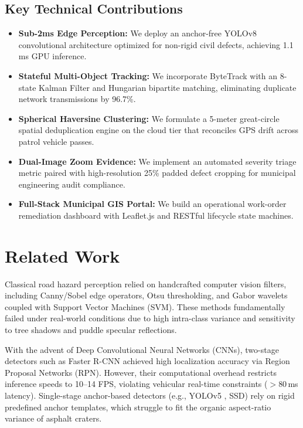 \documentclass[conference]{IEEEtran}
\begin{document}
\subsection{Key Technical Contributions}
\begin{itemize}
    \item \textbf{Sub-2ms Edge Perception:} We deploy an anchor-free YOLOv8 convolutional architecture optimized for non-rigid civil defects, achieving 1.1\,ms GPU inference.
    \item \textbf{Stateful Multi-Object Tracking:} We incorporate ByteTrack with an 8-state Kalman Filter and Hungarian bipartite matching, eliminating duplicate network transmissions by 96.7\%.
    \item \textbf{Spherical Haversine Clustering:} We formulate a 5-meter great-circle spatial deduplication engine on the cloud tier that reconciles GPS drift across patrol vehicle passes.
    \item \textbf{Dual-Image Zoom Evidence:} We implement an automated severity triage metric paired with high-resolution 25\% padded defect cropping for municipal engineering audit compliance.
    \item \textbf{Full-Stack Municipal GIS Portal:} We build an operational work-order remediation dashboard with Leaflet.js and RESTful lifecycle state machines.
\end{itemize}

\section{Related Work}
Classical road hazard perception relied on handcrafted computer vision filters, including Canny/Sobel edge operators, Otsu thresholding, and Gabor wavelets coupled with Support Vector Machines (SVM). These methods fundamentally failed under real-world conditions due to high intra-class variance and sensitivity to tree shadows and puddle specular reflections.

With the advent of Deep Convolutional Neural Networks (CNNs), two-stage detectors such as Faster R-CNN \cite{faster_rcnn} achieved high localization accuracy via Region Proposal Networks (RPN). However, their computational overhead restricts inference speeds to 10--14 FPS, violating vehicular real-time constraints ($>80$\,ms latency). Single-stage anchor-based detectors (e.g., YOLOv5 \cite{yolo_unified}, SSD) rely on rigid predefined anchor templates, which struggle to fit the organic aspect-ratio variance of asphalt craters.
\end{document}
